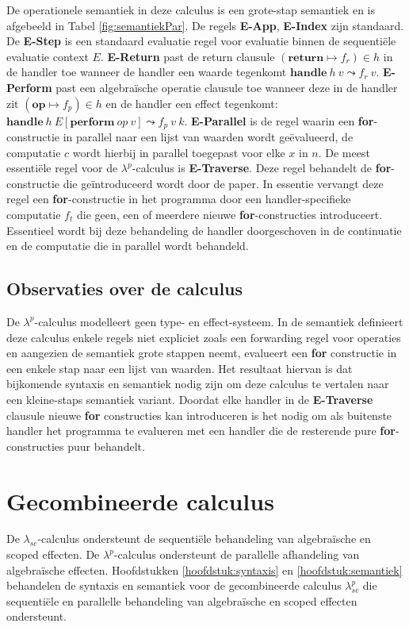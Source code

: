 De operationele semantiek in deze calculus is een grote-stap semantiek en is afgebeeld in Tabel \ref{fig:semantiekPar}. De regels \textbf{E-App}, \textbf{E-Index} zijn standaard. De \textbf{E-Step} is een standaard evaluatie regel voor evaluatie binnen de sequentiële evaluatie context $E$. \textbf{E-Return} past de return clausule $(\textbf{return} \mapsto f_{r}) \in h$ in de handler toe wanneer de handler een waarde tegenkomt $\textbf{handle}\:h\:v \leadsto f_{r}\:v$. \textbf{E-Perform} past een algebraïsche operatie clausule toe wanneer deze in de handler zit $(\textbf{op} \mapsto f_{p}) \in h$ en de handler een effect tegenkomt: $\textbf{handle}\:h\:E[\textbf{perform}\:op\:v] \leadsto f_{p}\:v\:k$. \textbf{E-Parallel} is de regel waarin een \textbf{for}-constructie in parallel naar een lijst van waarden wordt geëvalueerd, de computatie $c$ wordt hierbij in parallel toegepast voor elke $x$ in $n$. De meest essentiële regel voor de $\lambda^{p}$-calculus is \textbf{E-Traverse}. Deze regel behandelt de \textbf{for}-constructie die geïntroduceerd wordt door de paper. In essentie vervangt deze regel een \textbf{for}-constructie in het programma door een handler-specifieke computatie $f_t$ die geen, een of meerdere nieuwe \textbf{for}-constructies introduceert. Essentieel wordt bij deze behandeling de handler doorgeschoven in de continuatie en de computatie die in parallel wordt behandeld. \newline

\subsection{Observaties over de calculus}
De $\lambda^p$-calculus modelleert geen type- en effect-systeem. 
In de semantiek definieert deze calculus enkele regels niet expliciet zoals een forwarding regel voor operaties en aangezien de semantiek grote stappen neemt, evalueert een \textbf{for} constructie in een enkele stap naar een lijst van waarden. Het resultaat hiervan is dat bijkomende syntaxis en semantiek nodig zijn om deze calculus te vertalen naar een kleine-staps semantiek variant. Doordat elke handler in de \textbf{E-Traverse} clausule nieuwe \textbf{for} constructies kan introduceren is het nodig om als buitenste handler het programma te evalueren met een handler die de resterende pure \textbf{for}-constructies puur behandelt.

\section{Gecombineerde calculus}
De $\lambda_{sc}$-calculus ondersteunt de sequentiële behandeling van algebraïsche en scoped effecten. De $\lambda^{p}$-calculus ondersteunt de parallelle afhandeling van algebraïsche effecten. Hoofdstukken \ref{hoofdstuk:syntaxis} en \ref{hoofdstuk:semantiek} behandelen de syntaxis en semantiek voor de gecombineerde calculus $\lambda_{sc}^{p}$ die sequentiële en parallelle behandeling van algebraïsche en scoped effecten ondersteunt. 

